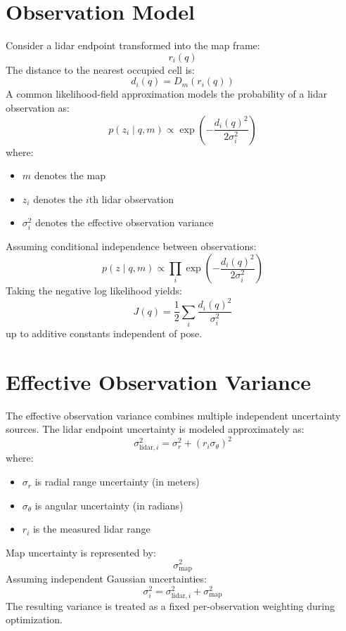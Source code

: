 \documentclass[11pt]{article}
\begin{document}
\section{Observation Model}

Consider a lidar endpoint transformed into the map frame:
\begin{equation}
r_i(q)
\end{equation}
The distance to the nearest occupied cell is:
\begin{equation}
d_i(q) = D_m(r_i(q))
\end{equation}
A common likelihood-field approximation models the probability of a lidar observation as:
\begin{equation}
p(z_i \mid q, m)
\propto
\exp\left(-\frac{d_i(q)^2}{2 \sigma_i^2}\right)
\end{equation}
where:
\begin{itemize}
    \item $m$ denotes the map
    \item $z_i$ denotes the $i$th lidar observation
    \item $\sigma_i^2$ denotes the effective observation variance
\end{itemize}
Assuming conditional independence between observations:
\begin{equation}
p(z \mid q,m)
\propto
\prod_i
\exp\left(-\frac{d_i(q)^2}{2\sigma_i^2}\right)
\end{equation}
Taking the negative log likelihood yields:
\begin{equation}
J(q)
=
\frac{1}{2}
\sum_i
\frac{d_i(q)^2}{\sigma_i^2}
\end{equation}
up to additive constants independent of pose.
\section{Effective Observation Variance}

The effective observation variance combines multiple independent uncertainty sources. The lidar endpoint uncertainty is modeled approximately as:
\begin{equation}
\sigma_{\text{lidar},i}^2
=
\sigma_r^2
+
(r_i \sigma_\theta)^2
\end{equation}
where:
\begin{itemize}
    \item $\sigma_r$ is radial range uncertainty (in meters)
    \item $\sigma_\theta$ is angular uncertainty (in radians)
    \item $r_i$ is the measured lidar range
\end{itemize}
Map uncertainty is represented by:
\begin{equation}
\sigma_{\text{map}}^2
\end{equation}
Assuming independent Gaussian uncertainties:
\begin{equation}
\sigma_i^2
=
\sigma_{\text{lidar},i}^2
+
\sigma_{\text{map}}^2
\end{equation}
The resulting variance is treated as a fixed per-observation weighting during optimization.
\end{document}
